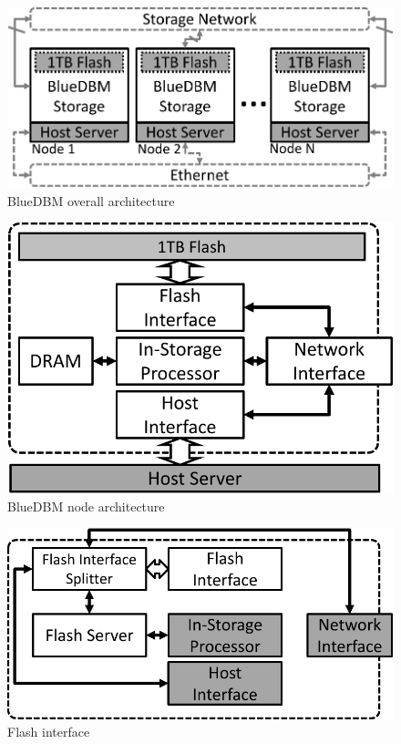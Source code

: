 \begin{figure}[h]
	\begin{center}
	\includegraphics[scale=0.45]{figures/architecture_small-crop.pdf}
	\caption{BlueDBM overall architecture}
	\label{fig:architecture}
	\end{center}
\end{figure}

\begin{figure}[h]
	\begin{center}
	\includegraphics[scale=0.45]{figures/architecture_node-crop.pdf}
	\caption{BlueDBM node architecture}
	\label{fig:architecture_node}
	\end{center}
\end{figure}

\begin{figure}[b]
	\begin{center}
	\includegraphics[scale=0.45]{figures/architecture_flash-crop.pdf}
	\caption{Flash interface}
	\label{fig:flashinterface}
	\end{center}
\end{figure}

